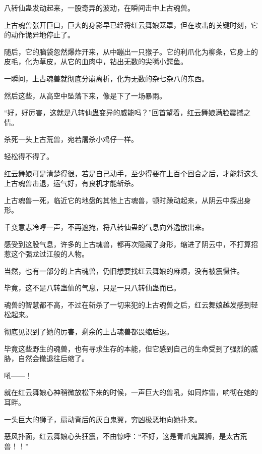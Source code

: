 \begin{this_body}
八转仙蛊发动起来，一股奇异的波动，在瞬间击中上古魂兽。

上古魂兽张开巨口，巨大的身影早已经将红云舞娘笼罩，但在攻击的关键时刻，它的动作诡异地停止了。

随后，它的脑袋忽然爆炸开来，从中蹦出一只猴子。它的利爪化为柳条，它身上的皮毛，化为草皮，从它的血肉中，钻出无数的尖嘴小鳄鱼。

一瞬间，上古魂兽就彻底分崩离析，化为无数的杂七杂八的东西。

然后这些，从高空中坠落下来，像是下了一场暴雨。

“好，好厉害，这就是八转仙蛊变异的威能吗？”回首望着，红云舞娘满脸震撼之情。

杀死一头上古荒兽，宛若屠杀小鸡仔一样。

轻松得不得了。

红云舞娘可是清楚得很，若是自己动手，至少得要在上百个回合之后，才能将这头上古魂兽击退，运气好，有良机才能斩杀。

上古魂兽一死，临近它的地盘的其他上古魂兽，顿时躁动起来，从阴云中探出身形。

千变意志冷哼一声，不再遮掩，将八转仙蛊的气息向外逸散出来。

感受到这股气息，许多的上古魂兽，都再次隐藏了身形，缩进了阴云中，不打算招惹这个强龙过江般的人物。

当然，也有一部分的上古魂兽，仍旧想要找红云舞娘的麻烦，没有被震慑住。

毕竟，这不是八转蛊仙的气息，只是一只八转仙蛊而已。

魂兽的智慧都不高，不过在斩杀了一切来犯的上古魂兽之后，红云舞娘越发感到轻松起来。

彻底见识到了她的厉害，剩余的上古魂兽都畏缩后退。

毕竟这些野生的魂兽，也有寻求生存的本能，但它感到自己的生命受到了强烈的威胁，自然会撤退往后缩了。

吼——！

就在红云舞娘心神稍微放松下来的时候，一声巨大的兽吼，如同炸雷，响彻在她的耳畔。

一头巨大的狮子，扇动背后的灰白鬼翼，穷凶极恶地向她扑来。

恶风扑面，红云舞娘心头狂震，不由惊呼：“不好，这是青爪鬼翼狮，是太古荒兽！！”

\end{this_body}

